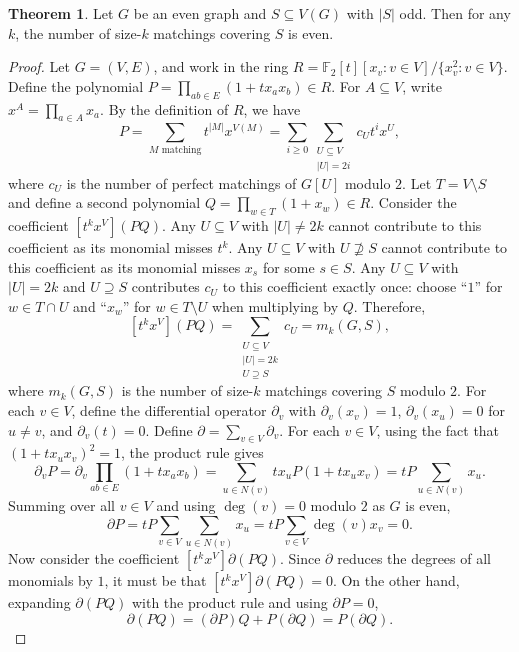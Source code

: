\documentclass{amsart}
\theoremstyle{definition}
\newtheorem{theorem}{Theorem}[section]
\theoremstyle{remark}
\begin{document}
\begin{theorem}\label{thm:oddset}
    Let $G$ be an even graph and $S\subseteq V(G)$ with $|S|$ odd. Then for any $k$, the number of size-$k$ matchings covering $S$ is even. 
\end{theorem}
\begin{proof}
    Let $G = (V, E)$, and work in the ring $R = \mathbb F_2[t][x_v:v\in V]/\{x_v^2:v\in V\}$. Define the polynomial $P = \prod_{ab\in E}(1+tx_ax_b)\in R$. For $A\subseteq V$, write $x^A = \prod_{a\in A}x_a$. By the definition of $R$, we have
    \[
        P = \sum_{M\text{ matching}}t^{|M|}x^{V(M)} = \sum_{i\ge 0}\sum_{\substack{U\subseteq V\\|U|=2i}} c_Ut^ix^U,
    \]
    where $c_U$ is the number of perfect matchings of $G[U]$ modulo $2$. Let $T = V\setminus S$ and define a second polynomial $Q = \prod_{w\in T}(1+x_w)\in R$. Consider the coefficient $[t^kx^V](P Q)$. Any $U\subseteq V$ with $|U| \neq 2k$ cannot contribute to this coefficient as its monomial misses $t^k$. Any $U\subseteq V$ with $U\not\supseteq S$ cannot contribute to this coefficient as its monomial misses $x_s$ for some $s\in S$. Any $U\subseteq V$ with $|U|=2k$ and $U\supseteq S$ contributes $c_U$ to this coefficient exactly once: choose ``$1$'' for $w\in T\cap U$ and ``$x_w$'' for $w\in T\setminus U$ when multiplying by $Q$. Therefore,
    \[
        [t^kx^V](P Q) = \sum_{\substack{U\subseteq V\\|U|=2k\\U\supseteq S}} c_U = m_k(G, S),
    \]
    where $m_k(G, S)$ is the number of size-$k$ matchings covering $S$ modulo $2$. For each $v\in V$, define the differential operator $\partial_v$ with $\partial_v(x_v) = 1$, $\partial_v(x_u) = 0$ for $u\neq v$, and $\partial_v(t) = 0$. Define $\partial = \sum_{v\in V}\partial_v$. For each $v\in V$, using the fact that $(1+tx_u x_v)^2 = 1$, the product rule gives
    \[
        \partial_v P = \partial_v\prod_{ab\in E}(1+tx_ax_b) = \sum_{u\in N(v)}tx_uP(1+tx_ux_v) = tP\sum_{u\in N(v)}x_u.
    \]
    Summing over all $v\in V$ and using $\deg(v) = 0$ modulo $2$ as $G$ is even,
    \[
        \partial P = tP\sum_{v\in V}\sum_{u\in N(v)}x_u = tP\sum_{v\in V}\deg(v)x_v = 0.
    \]
    Now consider the coefficient $[t^kx^V]\partial(P Q)$. Since $\partial$ reduces the degrees of all monomials by $1$, it must be that $[t^kx^V]\partial(P Q) = 0$. On the other hand, expanding $\partial(P Q)$ with the product rule and using $\partial P=0$,
    \[
        \partial(P Q) = (\partial P) Q + P(\partial Q) = P(\partial Q).
    \]

\end{proof}
\end{document}
